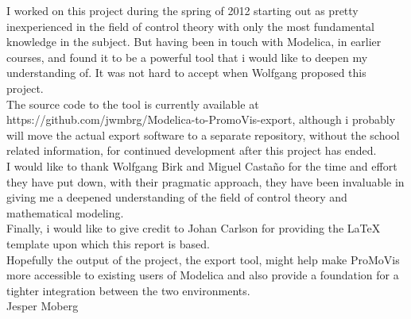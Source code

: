 I worked on this project during the spring of 2012 starting out as pretty inexperienced in the field of control theory with only the most fundamental knowledge in the subject. But having been in touch with Modelica, in earlier courses, and found it to be a powerful tool that i would like to deepen my understanding of. It was not hard to accept when Wolfgang proposed this project.\\\newline The source code to the tool is currently available at https://github.com/jwmbrg/Modelica-to-PromoVis-export, although i probably will move the actual export software to a separate repository, without the school related information, for continued development after this project has ended.\\\newline I would like to thank Wolfgang Birk and Miguel Casta{\~{n}}o for the time and effort they have put down,  with their pragmatic approach, they have been invaluable in giving me a deepened understanding of the field of control theory and mathematical modeling.\\\newline Finally, i would like to give credit to Johan Carlson for providing the \LaTeX{} template upon which this report is based. \\\newline Hopefully the output of the project, the export tool, might help make ProMoVis more accessible to existing users of Modelica and also provide a foundation for a tighter integration between the two environments.\\\newline
\vspace*{2cm}%
\hfill Jesper Moberg
